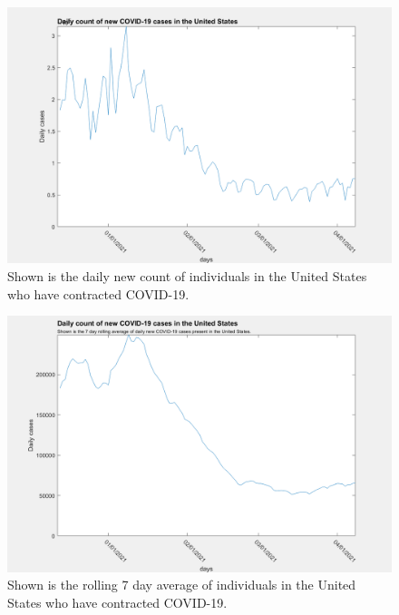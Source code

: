 \documentclass[twoside]{article}
\begin{document}
\begin{multicols}{2}
\begin{figure}[H]
	\includegraphics[width=\linewidth]{images/usa_daily_cases_unprocessed.png}
	\caption{Shown is the daily new count of individuals in the United States who have contracted COVID-19.}
	\label{fig:images/usa_daily_cases_unprocessedLabel}
\end{figure}

\begin{figure}[H]
	\includegraphics[width=\linewidth]{images/usa_daily_cases_processed.png}
	\caption{Shown is the rolling 7 day average of individuals in the United States who have contracted COVID-19.}
	\label{fig:images/usa_daily_cases_processedLabel}
\end{figure}


\end{multicols}
\end{document}
